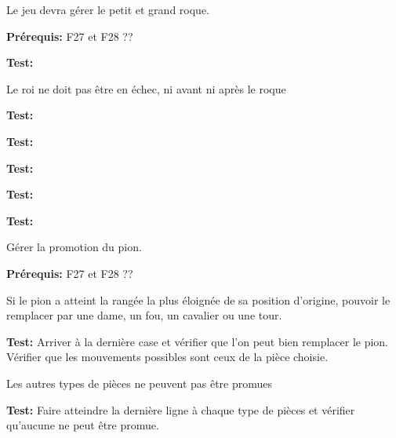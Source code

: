 \documentclass{article}
\begin{document}
\begin{needbox}[F30. Roque]
    Le jeu devra gérer le petit et grand roque.

    \textbf{Prérequis:} F27 et F28 ??
    \begin{subneedbox}
        

        \textbf{Test:}
    \end{subneedbox}
    \begin{subneedbox}
        Le roi ne doit pas être en échec, ni avant ni après le roque

        \textbf{Test:}
    \end{subneedbox}
    \begin{subneedbox}
        

        \textbf{Test:}
    \end{subneedbox}
    \begin{subneedbox}
        

        \textbf{Test:}
    \end{subneedbox}
    \begin{subneedbox}
        

        \textbf{Test:}
    \end{subneedbox}
    \begin{subneedbox}
        

        \textbf{Test:}
    \end{subneedbox}
\end{needbox}

\begin{needbox}
    Gérer la promotion du pion.

    \textbf{Prérequis:} F27 et F28 ??
    \begin{subneedbox}
        Si le pion a atteint la rangée la plus éloignée de sa position d'origine, pouvoir le remplacer par
        une dame, un fou, un cavalier ou une tour.

        \textbf{Test:} Arriver à la dernière case et vérifier que l'on peut bien remplacer le pion. 
        Vérifier que les mouvements possibles sont ceux de la pièce choisie.
    \end{subneedbox}
    \begin{subneedbox}
        Les autres types de pièces ne peuvent pas être promues

        \textbf{Test:} Faire atteindre la dernière ligne à chaque type de pièces
         et vérifier qu'aucune ne peut être promue.
    \end{subneedbox}
\end{needbox}
\end{document}
